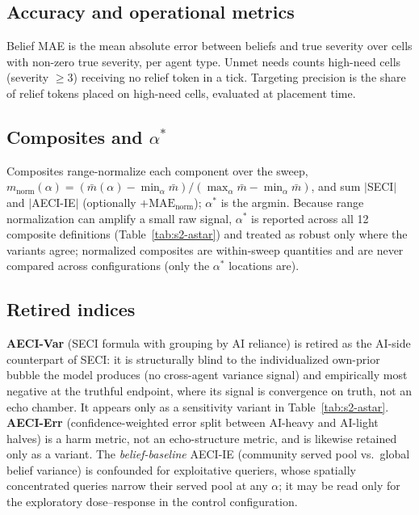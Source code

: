 \documentclass[11pt]{article}
\begin{document}
\subsection{Accuracy and operational metrics}

Belief MAE is the mean absolute error between beliefs and true severity
over cells with non-zero true severity, per agent type. Unmet needs
counts high-need cells (severity $\geq 3$) receiving no relief token in
a tick. Targeting precision is the share of relief tokens placed on
high-need cells, evaluated at placement time.

\subsection{Composites and $\alpha^{*}$}

Composites range-normalize each component over the sweep,
$m_{\mathrm{norm}}(\alpha) = (\bar m(\alpha) - \min_\alpha \bar m) /
(\max_\alpha \bar m - \min_\alpha \bar m)$, and sum $|$SECI$|$ and
$|$AECI-IE$|$ (optionally $+\mathrm{MAE}_{\mathrm{norm}}$);
$\alpha^{*}$ is the argmin. Because range normalization can amplify a
small raw signal, $\alpha^{*}$ is reported across all 12 composite
definitions (Table~\ref{tab:s2-astar}) and treated as robust only where
the variants agree; normalized composites are within-sweep quantities and
are never compared across configurations (only the $\alpha^{*}$
locations are).

\subsection{Retired indices}

\textbf{AECI-Var} (SECI formula with grouping by AI reliance) is retired
as the AI-side counterpart of SECI: it is structurally blind to the
individualized own-prior bubble the model produces (no cross-agent
variance signal) and empirically most negative at the truthful endpoint,
where its signal is convergence on truth, not an echo chamber. It appears
only as a sensitivity variant in Table~\ref{tab:s2-astar}.
\textbf{AECI-Err} (confidence-weighted error split between AI-heavy and
AI-light halves) is a harm metric, not an echo-structure metric, and is
likewise retained only as a variant. The \emph{belief-baseline} AECI-IE
(community served pool vs.\ global belief variance) is confounded for
exploitative queriers, whose spatially concentrated queries narrow their
served pool at any $\alpha$; it may be read only for the exploratory
dose--response in the control configuration.
\end{document}
